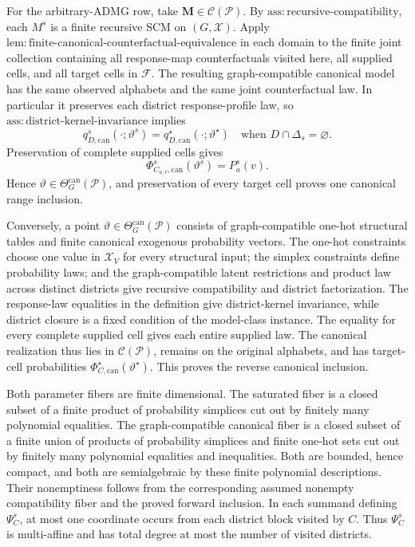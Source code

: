 For the arbitrary-ADMG row, take \(\mathbf M\in\mathcal C(\mathcal P)\).  By \(\mathrm{ass:recursive\text{-}compatibility}\), each \(M^s\) is a finite recursive SCM on \((G,\mathcal X)\).  Apply \(\mathrm{lem:finite\text{-}canonical\text{-}counterfactual\text{-}equivalence}\) in each domain to the finite joint collection containing all response-map counterfactuals visited here, all supplied cells, and all target cells in \(\mathcal F\).  The resulting graph-compatible canonical model has the same observed alphabets and the same joint counterfactual law.  In particular it preserves each district response-profile law, so \(\mathrm{ass:district\text{-}kernel\text{-}invariance}\) implies
\[
q_{D,\mathrm{can}}^s(\mathord\cdot;\vartheta^s)
=q_{D,\mathrm{can}}^\star(\mathord\cdot;\vartheta^\star)
\quad\text{when }D\cap\Delta_s=\varnothing.
\]
Preservation of complete supplied cells gives
\[
\Phi_{C_{a,v},\mathrm{can}}^s(\vartheta^s)=P_a^s(v).
\]
Hence \(\vartheta\in\Theta_G^{\mathrm{can}}(\mathcal P)\), and preservation of every target cell proves one canonical range inclusion.

Conversely, a point \(\vartheta\in\Theta_G^{\mathrm{can}}(\mathcal P)\) consists of graph-compatible one-hot structural tables and finite canonical exogenous probability vectors.  The one-hot constraints choose one value in \(\mathcal X_V\) for every structural input; the simplex constraints define probability laws; and the graph-compatible latent restrictions and product law across distinct districts give recursive compatibility and district factorization.  The response-law equalities in the definition give district-kernel invariance, while district closure is a fixed condition of the model-class instance.  The equality for every complete supplied cell gives each entire supplied law.  The canonical realization thus lies in \(\mathcal C(\mathcal P)\), remains on the original alphabets, and has target-cell probabilities \(\Phi_{C,\mathrm{can}}^\star(\vartheta^\star)\).  This proves the reverse canonical inclusion.

Both parameter fibers are finite dimensional.  The saturated fiber is a closed subset of a finite product of probability simplices cut out by finitely many polynomial equalities.  The graph-compatible canonical fiber is a closed subset of a finite union of products of probability simplices and finite one-hot sets cut out by finitely many polynomial equalities and inequalities.  Both are bounded, hence compact, and both are semialgebraic by these finite polynomial descriptions.  Their nonemptiness follows from the corresponding assumed nonempty compatibility fiber and the proved forward inclusion.  In each summand defining \(\Psi_C^s\), at most one coordinate occurs from each district block visited by \(C\).  Thus \(\Psi_C^s\) is multi-affine and has total degree at most the number of visited districts.

